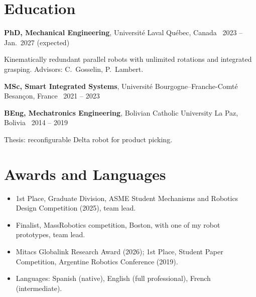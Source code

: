 \documentclass[10pt,letterpaper]{article}
\begin{document}
\section{Education}
\textbf{PhD, Mechanical Engineering}, Universit\'e Laval \hfill {\color{muted}Qu\'ebec, Canada \textbar\ 2023 -- Jan.\ 2027 (expected)}\par
{\small Kinematically redundant parallel robots with unlimited rotations and integrated grasping. Advisors: C.~Gosselin, P.~Lambert.}\par\vspace{2pt}
\textbf{MSc, Smart Integrated Systems}, Universit\'e Bourgogne--Franche-Comt\'e \hfill {\color{muted}Besan\c{c}on, France \textbar\ 2021 -- 2023}\par\vspace{2pt}
\textbf{BEng, Mechatronics Engineering}, Bolivian Catholic University \hfill {\color{muted}La Paz, Bolivia \textbar\ 2014 -- 2019}\par
{\small Thesis: reconfigurable Delta robot for product picking.}

\section{Awards and Languages}
\begin{itemize}
\item 1st Place, Graduate Division, ASME Student Mechanisms and Robotics Design Competition (2025), team lead.
\item Finalist, MassRobotics competition, Boston, with one of my robot prototypes, team lead.
\item Mitacs Globalink Research Award (2026); 1st Place, Student Paper Competition, Argentine Robotics Conference (2019).
\item Languages: Spanish (native), English (full professional), French (intermediate).
\end{itemize}

\newpage
\end{document}

